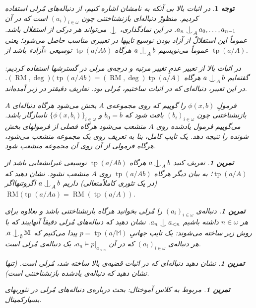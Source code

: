 \documentclass[12pt,a4paper]{report}
\def\Ind#1#2{#1\setbox0=\hbox{$#1x$}\kern\wd0\hbox to 0pt{\hss$#1\mid$\hss}
\lower.9\ht0\hbox to 0pt{\hss$#1\smile$\hss}\kern\wd0}
\def\ind{\mathop{\mathpalette\Ind{}}}
\theoremstyle{colorhead}
\newtheorem{tam}[thm]{تمرین}
\newtheorem{tav}[thm]{توجه}
\DeclareMathOperator{\RM}{RM}
\DeclareMathOperator{\tp}{tp}
\begin{document}
\begin{framed}
\begin{tav}
در اثبات بالا بی آنکه به نامشان اشاره کنیم، از دنباله‌های مُرلی
استفاده کردیم. منظورْ‌
دنباله‌ای 
بازنشناختنی
چون
$(a_i)_{i\in \omega}$
است که در آن
$a_n\ind_A a_0,\ldots,a_{n-1}$.
در این نمادگذاری،
$\ind$
می‌تواند هر درکی از استقلال باشد. عموماً‌ این استقلالْ از آزاد بودن توسیع تایپها در تعبیری مناسب
حاصل می‌شود؛ یعنی عموماً می‌نویسیم
$a\ind_A b$
هرگاه
$\tp(a/Ab)$
توسیعی «آزاد» باشد از 
$\tp(a/A)$.
\par 
در اثبات بالا از تعبیر عدمِ تغییر مرتبه‌ و درجه‌ی مرلی در گسترشها استفاده کردیم: گفته‌ایم
$a\ind_A b$
هرگاه
$(\RM,\deg)(\tp(a/Ab)=(\RM,\deg)\tp(a/A)$.
در این تعبیر، دنباله‌ای که در اثبات ساختیم، مُرلی بود. تعاریف دقیقتر در زیر آمده‌اند.
\par 
فرمولِ
$\phi(x,b)$
را گوییم که روی مجموعه‌ی
$A$
بخش می‌شود هرگاه
دنباله‌ای $A$بازنشناختنی چون
$(b_i)_{i\in \omega}$
یافت شود که 
$b_0=b$
و
$\{\phi(x,b_i)\}_{i\in \omega}$
ناسازگار باشد. می‌گوییم فرمول یادشده روی
$A$
منشعب می‌شود هرگاه فصلی از فرمولهای بخش شونده را نتیجه دهد. یک تایپ کامل، بنا به تعریف روی 
یک مجموعه منشعب می‌شود، هرگاه 
فرمولی از آن روی آن مجموعه منشعب شود. 
\begin{tam}
تعریف کنید
$a\ind_A b$
هرگاه
$\tp(a/Ab)$
توسیعی غیرانشعابی باشد از
$\tp(a/A)$؛
به بیان دیگر هرگاه
$\tp(a/Ab)$
روی
$A$
منشعب نشود. 
نشان دهید که (در یک تئوری کاملاً‌متعالی) داریم
$a\ind_A b$
اگروتنهااگر
$\RM(\tp(a/Aa)=\RM(\tp(a/A))$.
\end{tam}
\begin{tam}
دنباله‌ی 
$(a_i)_{i\in \omega}$
را مُرلی بخوانید هرگاه
بازنشناختنی باشد و بعلاوه
برای هر
$n\in \omega$
داشته باشیم
$a_n\ind a_{<n}$.
نشان دهید که 
دنباله‌های مُرلی دقیقاً‌
آنهاییند که با روش زیر ساخته‌ می‌شوند: یک تایپ جهانیِ
$p=\tp(a/\mathbb{M})$
پیدا می‌کنیم که 
$a\ind_\emptyset \mathbb{M}$.
هر دنباله‌ی 
$(a_i)_{i\in \omega}$
که در آن
$a_n\models p|_{a_{<n}}$،
یک دنباله‌ی مُرلی است. 
\end{tam}
\begin{tam}
نشان دهید دنباله‌ای که در اثبات قضیه‌ی بالا ساخته شد،‌ مُرلی است.  (تنها نشان دهید که دنباله‌ی یادشده بازنشناختنی است).
\end{tam}
\begin{tam}
مربوط به کلاس آموختال: بحث درباره‌ی دنباله‌های مُرلی در تئوریهای بسیارکمینال.
\end{tam}
\end{tav}
\end{framed}

\pagebreak
\end{document}
